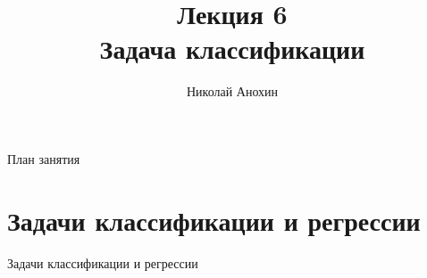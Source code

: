 \documentclass[10pt]{beamer}
\author{Николай Анохин}
\title{\newline \newline \newline Лекция 6 \\ Задача классификации}
\let\otp\titlepage
\renewcommand{\titlepage}{\otp\addtocounter{framenumber}{-1}}
\begin{document}
\begin{frame}[plain]
\titlepage
\end{frame}

\begin{frame}{План занятия}
\tableofcontents
\end{frame}

\section{Задачи классификации и регрессии}

\begin{frame}{}

\begin{center}
\Large Задачи классификации и регрессии
\end{center}

\end{frame}
\end{document}
